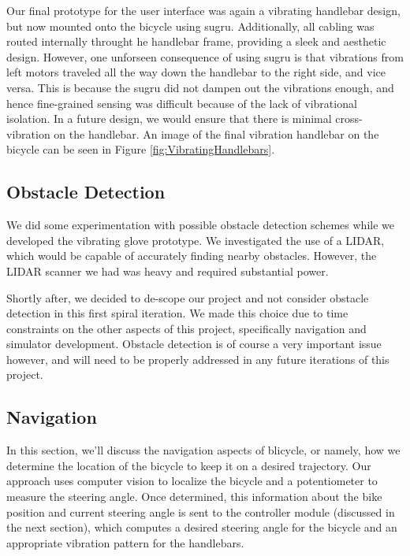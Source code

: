 \documentclass[aps,twocolumn,secnumarabic,balancelastpage,amsmath,amssymb,nofootinbib]{revtex4-1}
\begin{document}
Our final prototype for the user interface was again a vibrating handlebar design, but now mounted onto the bicycle using sugru. Additionally, all cabling was routed internally throught he handlebar frame, providing a sleek and aesthetic design. However, one unforseen consequence of using sugru is that vibrations from left motors traveled all the way down the handlebar to the right side, and vice versa. This is because the sugru did not dampen out the vibrations enough, and hence fine-grained sensing was difficult because of the lack of vibrational isolation. In a future design, we would ensure that there is minimal cross-vibration on the handlebar. An image of the final vibration handlebar on the bicycle can be seen in Figure \ref{fig:VibratingHandlebars}.


\subsection{Obstacle Detection}
We did some experimentation with possible obstacle detection schemes while we developed the vibrating glove prototype. We investigated the use of a LIDAR, which would be capable of accurately finding nearby obstacles. However, the LIDAR scanner we had was heavy and required substantial power.

Shortly after, we decided to de-scope our project and not consider obstacle detection in this first spiral iteration. We made this choice due to time constraints on the other aspects of this project, specifically navigation and simulator development. Obstacle detection is of course a very important issue however, and will need to be properly addressed in any future iterations of this project.

\subsection{Navigation}
In this section, we'll discuss the navigation aspects of blicycle, or namely, how we determine the location of the bicycle to keep it on a desired trajectory. Our approach uses computer vision to localize the bicycle and a potentiometer to measure the steering angle. Once determined, this information about the bike position and current steering angle is sent to the controller module (discussed in the next section), which computes a desired steering angle for the bicycle and an appropriate vibration pattern for the handlebars. 
\end{document}
